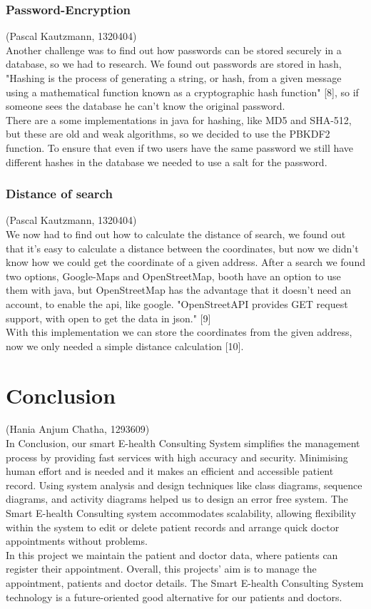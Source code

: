 \documentclass[a4paper, 12pt]{report}
\begin{document}
\subsection{Password-Encryption}
{\tiny (Pascal Kautzmann, 1320404)\\}
Another challenge was to find out how passwords can be stored securely in a database, so we had to research. We found out passwords are stored in hash, "Hashing is the process of generating a string, or hash, from a given message using a mathematical function known as a cryptographic hash function" [8], so if someone sees the database he can't know the original password. \\
There are a some implementations in java for hashing, like MD5 and SHA-512, but these are old and weak algorithms, so we decided to use the PBKDF2 function. To ensure that even if two users have the same password we still have different hashes in the database we needed to use a salt for the password.


\subsection{Distance of search}
{\tiny (Pascal Kautzmann, 1320404)\\}
We now had to find out how to calculate the distance of search, we found out that it's easy to calculate a distance between the coordinates, but now we didn't know how we could get the coordinate of a given address. After a search we found two options, Google-Maps and OpenStreetMap, booth have an option to use them with java, but OpenStreetMap has the advantage
that it doesn't need an account, to enable the api, like google. "OpenStreetAPI provides GET request support, with open to get the data in json." [9]\\
With this implementation we can store the coordinates from the given address, now we only needed a simple distance calculation [10]. 
 

\chapter{Conclusion}
{\tiny (Hania Anjum Chatha, 1293609)\\}
In Conclusion, our smart E-health Consulting System simplifies the management process by providing fast services with high accuracy and security. Minimising human effort and is needed and it  makes an efficient and accessible patient record. Using system analysis and design techniques like class diagrams, sequence diagrams, and activity diagrams helped us to design an error free system. The Smart E-health Consulting system accommodates scalability, allowing flexibility within the system to edit or delete patient records and arrange quick doctor appointments without problems. \\
In this project we maintain the patient and doctor data, where patients can register their appointment. Overall, this projects' aim is to manage the appointment, patients and doctor details. The Smart E-health Consulting System technology is a future-oriented good alternative for our patients and doctors.
\end{document}
